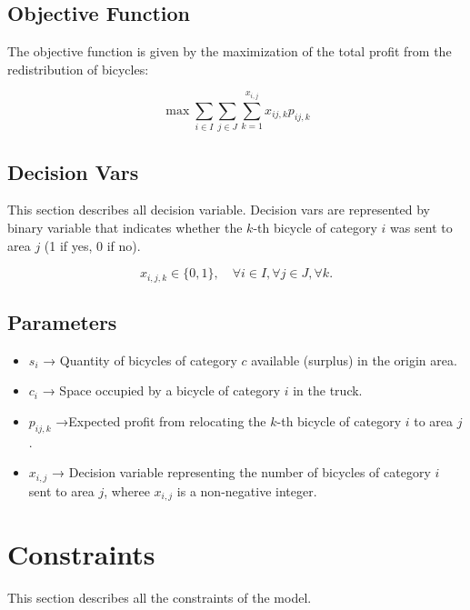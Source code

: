\documentclass[]{article}
\begin{document}
\subsection{Objective Function}

The objective function is given by the maximization of the total profit from the redistribution of bicycles:

\begin{equation}
\max \sum_{i \in I} \sum_{j \in J} \sum_{k=1}^{x_{i,j}} x_{ij,k}p_{ij,k}
\end{equation}

\subsection{Decision Vars}
This section describes all decision variable. Decision vars are represented by binary variable that indicates whether the \( k \)-th bicycle of category \( i \) was sent to area \( j \) (1 if yes, 0 if no).

\begin{equation}
	x_{i,j,k} \in \{0, 1\}, \quad \forall i \in I, \forall j \in J, \forall k.
\end{equation}

\subsection{Parameters}

\begin{itemize}
	\item $s_i$ → Quantity of bicycles of category 
	$c$ available (surplus) in the origin area.
	\item $c_i$ → Space occupied by a bicycle of category $i$ in the truck.
	\item $p_{ij,k}$ →Expected profit from relocating the 
	$k$-th bicycle of category $i$ to area $j$.
	\item $x_{i,j}$ → Decision variable representing the number of bicycles of category $i$ sent to area $j$, wheree $x_{i,j}$ is a non-negative integer.
\end{itemize}

\section{Constraints}

This section describes all the constraints of the model.
\end{document}
